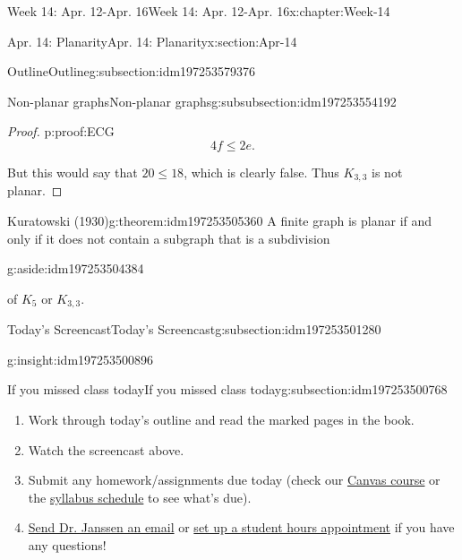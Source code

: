 \documentclass[oneside,10pt,]{book}
\numberwithin{equation}{section}
\renewcommand{\le}{\leqslant}
\begin{document}
\begin{chapterptx}{Week 14: Apr. 12-Apr. 16}{}{Week 14: Apr. 12-Apr. 16}{}{}{x:chapter:Week-14}
\begin{sectionptx}{Apr. 14: Planarity}{}{Apr. 14: Planarity}{}{}{x:section:Apr-14}
\begin{subsectionptx}{Outline}{}{Outline}{}{}{g:subsection:idm197253579376}
\begin{subsubsectionptx}{Non-planar graphs}{}{Non-planar graphs}{}{}{g:subsubsection:idm197253554192}
\begin{proof}{}{p:proof:ECG}
\begin{equation*}
4f \le 2e\text{.}
\end{equation*}
%
\par
But this would say that \(20 \le 18\), which is clearly false. Thus \(K_{3,3}\) is not planar.%
\end{proof}
\begin{theorem}{}{Kuratowski (1930)}{g:theorem:idm197253505360}%
A finite graph is planar if and only if it does not contain a subgraph that is a subdivision\begin{aside}{}{g:aside:idm197253504384}%
\end{aside}
 of \(K_5\) or \(K_{3,3}\).%
\end{theorem}
\end{subsubsectionptx}
\end{subsectionptx}
%
%
\typeout{************************************************}
\typeout{************************************************}
%
\begin{subsectionptx}{Today's Screencast}{}{Today's Screencast}{}{}{g:subsection:idm197253501280}
\begin{insight}{}{g:insight:idm197253500896}%
\end{insight}
\end{subsectionptx}
%
%
\typeout{************************************************}
\typeout{************************************************}
%
\begin{subsectionptx}{If you missed class today}{}{If you missed class today}{}{}{g:subsection:idm197253500768}
%
\begin{enumerate}
\item{}Work through today's outline and read the marked pages in the book.%
\item{}Watch the screencast above.%
\item{}Submit any homework\slash{}assignments due today (check our \href{https://dordt.instructure.com/courses/3110050}{Canvas course} or the \href{https://prof.mkjanssen.org/ds/index.html\#schedule}{syllabus schedule} to see what's due).%
\item{}\href{mailto:mike.janssen@dordt.edu}{Send Dr. Janssen an email} or \href{https://calendly.com/mkjanssen/student-hours}{set up a student hours appointment} if you have any questions!%
\end{enumerate}
\end{subsectionptx}
\end{sectionptx}

\end{chapterptx}
\end{document}
